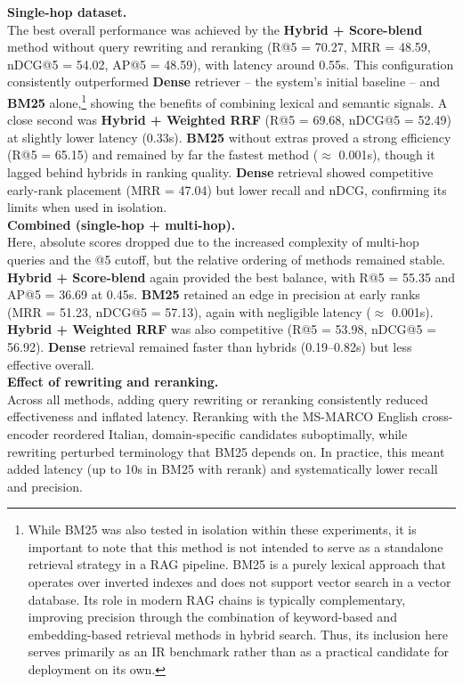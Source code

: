 \begin{spacing}{1.5}
\noindent \textbf{Single-hop dataset.}\\
The best overall performance was achieved by the \textbf{Hybrid + Score-blend} method without query rewriting and reranking (R@5 = 70.27, MRR = 48.59, nDCG@5 = 54.02, AP@5 = 48.59), with latency around 0.55s. This configuration consistently outperformed \textbf{Dense} retriever -- the system’s initial baseline -- and \textbf{BM25} alone,\footnote{\label{note:BM25}While BM25 was also tested in isolation within these experiments, it is important to note that this method is not intended to serve as a standalone retrieval strategy in a RAG pipeline. BM25 is a purely lexical approach that operates over inverted indexes and does not support vector search in a vector database. Its role in modern RAG chains is typically complementary, improving precision through the combination of keyword-based and embedding-based retrieval methods in hybrid search. Thus, its inclusion here serves primarily as an IR benchmark rather than as a practical candidate for deployment on its own.} showing the benefits of combining lexical and semantic signals. A close second was \textbf{Hybrid + Weighted RRF} (R@5 = 69.68, nDCG@5 = 52.49) at slightly lower latency (0.33s).
\textbf{BM25} without extras proved a strong efficiency (R@5 = 65.15) and remained by far the fastest method ($\approx$ 0.001s), though it lagged behind hybrids in ranking quality. \textbf{Dense} retrieval showed competitive early-rank placement (MRR = 47.04) but lower recall and nDCG, confirming its limits when used in isolation.\\

\noindent \textbf{Combined (single-hop + multi-hop).}\\
Here, absolute scores dropped due to the increased complexity of multi-hop queries and the @5 cutoff, but the relative ordering of methods remained stable. \textbf{Hybrid + Score-blend} again provided the best balance, with R@5 = 55.35 and AP@5 = 36.69 at 0.45s. \textbf{BM25} retained an edge in precision at early ranks (MRR = 51.23, nDCG@5 = 57.13), again with negligible latency ($\approx$ 0.001s). \textbf{Hybrid + Weighted RRF} was also competitive (R@5 = 53.98, nDCG@5 = 56.92). \textbf{Dense} retrieval remained faster than hybrids (0.19--0.82s) but less effective overall.\\

\noindent \textbf{Effect of rewriting and reranking.}\\
Across all methods, adding query rewriting or reranking consistently reduced effectiveness and inflated latency. Reranking with the MS-MARCO English cross-encoder reordered Italian, domain-specific candidates suboptimally, while rewriting perturbed terminology that BM25 depends on. In practice, this meant added latency (up to 10s in BM25 with rerank) and systematically lower recall and precision.\\


\end{spacing}
